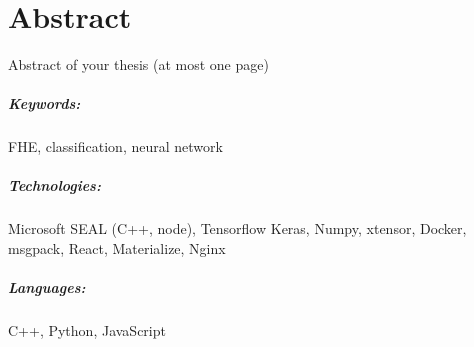 \chapter*{Abstract}
Abstract of your thesis (at most one page)

\Blindtext[2]

\paragraph{Keywords:}
FHE, classification, neural network

\paragraph{Technologies:}
Microsoft SEAL (C++, node),
Tensorflow Keras,
Numpy,
xtensor,
Docker,
msgpack,
React,
Materialize,
Nginx

\paragraph{Languages:}
C++, Python, JavaScript
